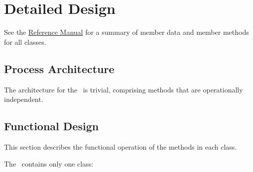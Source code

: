 
%
%
% 
%

\section{Detailed Design}
\label{sec:relativedetail}
See the \href{file:refman.pdf}{Reference Manual}\cite{derivedstatebib:ReferenceManual} for a summary of member data and member methods for all classes.  

\subsection{Process Architecture}
The architecture for the \RelativeDesc\ is trivial, comprising methods that are operationally independent.

\subsection{Functional Design}
This section describes the functional operation of the methods in each class.


The \RelativeDesc\ contains only one class:

